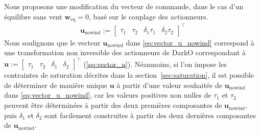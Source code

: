         Nous proposons une modification du vecteur de commande, dans le cas d'un équilibre sans vent $\boldsymbol{w}_{\mathrm{eq}} = 0$, basé sur le couplage des actionneurs. 
        \begin{align}
            \label{eq:vector_u_nowind}
            \boldsymbol{u}_{\text{nowind}} := \begin{bmatrix}\tau_{1}  \!&\! \tau_{2}  \!&\! \delta_{1}\tau_{1} \!&\! \delta_{2}\tau_{2} \end{bmatrix}^\top
        \end{align}
        Nous soulignons que le vecteur $\boldsymbol{u}_{\text{nowind}}$ dans \eqref{eq:vector_u_nowind} correspond à une transformation non inversible des actionneurs de DarkO correspondant à $\boldsymbol{u} := \begin{bmatrix}\tau_{1}  \!&\! \tau_{2}  \!&\! \delta_{1} \!&\! \delta_{2} \end{bmatrix}^\top$ (\eqref{eq:vector_u}). Néanmoins, si l'on impose les contraintes de saturation décrites dans la section~\ref{sec:saturation}, il est possible de déterminer de manière unique $\boldsymbol{u}$ à partir d'une valeur souhaitée de $\boldsymbol{u}_{\text{nowind}}$ dans \eqref{eq:vector_u_nowind}, car les valeurs positives non nulles de $\tau_{1}$ et $\tau_{2}$ peuvent être déterminées à partir des deux premières composantes de $\boldsymbol{u}_{\text{nowind}}$, puis $\delta_1$ et $\delta_2$ sont facilement construites à partir des deux dernières composantes de $\boldsymbol{u}_{\text{nowind}}$. 

